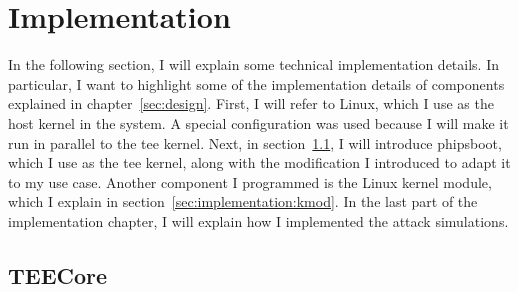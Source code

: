 \chapter{Implementation}
\label{sec:implementation}


In the following section, I will explain some technical implementation details.
In particular, I want to highlight some of the implementation details of
components explained in chapter~\ref{sec:design}. First, I will refer to Linux,
which I use as the host kernel in the system. A special configuration was used
because I will make it run in parallel to the \gls{tee} kernel. Next, in
section~\ref{sec:implementation:teeKernel}, I will introduce phipsboot, which I
use as the \gls{tee} kernel, along with the modification I introduced to adapt
it to my use case. Another component I programmed is the Linux kernel module,
which I explain in section~\ref{sec:implementation:kmod}. In the last part of
the implementation chapter, I will explain how I implemented the attack
simulations.

\section{TEECore}
\label{sec:implementation:teeKernel}

